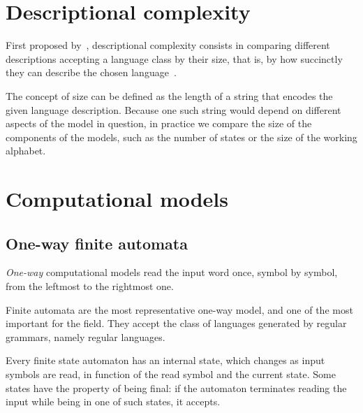 \section{Descriptional complexity}
First proposed by~\citeauthor{MeyFis71}, descriptional complexity consists in comparing different descriptions accepting a language class by their size, that is, by how succinctly they can describe the chosen language~\cite{MeyFis71}.

The concept of size can be defined as the length of a string that encodes the given language description.
Because one such string would depend on different aspects of the model in question, in practice we compare the size of the components of the models, such as the number of states or the size of the working alphabet.



\section{Computational models}


\subsection{One-way finite automata}
\emph{One-way} computational models read the input word once, symbol by symbol, from the leftmost to the rightmost one.

Finite automata are the most representative one-way model, and one of the most important for the field.
They accept the class of languages generated by regular grammars, namely regular languages.

Every finite state automaton has an internal state, which changes as input symbols are read, in function of the read symbol and the current state.
Some states have the property of being final: if the automaton terminates reading the input while being in one of such states, it accepts.

